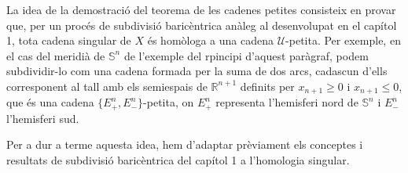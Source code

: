 \documentclass[../main.tex]{subfiles}
\begin{document}
La idea de la demostració del teorema de les cadenes petites consisteix en provar que, per un procés de subdivisió baricèntrica anàleg al desenvolupat en el capítol 1, tota cadena singular de $X$ és homòloga a una cadena $\mathcal{U}$-petita. Per exemple, en el cas del meridià de $\mathbb{S}^n$ de l'exemple del rpincipi d'aquest paràgraf, podem subdividir-lo com una cadena formada per la suma de dos arcs, cadascun d'ells corresponent al tall amb els semiespais de $\mathbb{R}^{n+1}$ definits per $x_{n+1}\geq 0$ i $x_{n+1}\leq 0$, que és una cadena $\{E_+^n,E_-^n\}$-petita, on $E_+^n$ representa l'hemisferi nord de $\mathbb{S}^n$ i $E_-^n$ l'hemisferi sud.

Per a dur a terme aquesta idea, hem d'adaptar prèviament els conceptes i resultats de subdivisió baricèntrica del capítol 1 a l'homologia singular.
\end{document}
